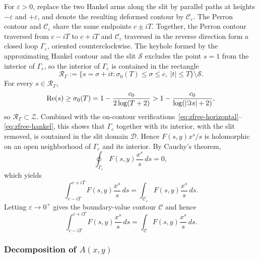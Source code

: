 For $\varepsilon>0$, replace the two Hankel arms along the slit by
parallel paths at heights $-\varepsilon$ and $+\varepsilon$, and
denote the resulting deformed contour by $\mathcal{C}_\varepsilon$.
The Perron contour and $\mathcal{C}_\varepsilon$ share the same
endpoints $c \pm iT$. Together, the Perron contour traversed from
$c - iT$ to $c + iT$ and $\mathcal{C}_\varepsilon$ traversed in
the reverse direction form a closed loop $\Gamma_\varepsilon$,
oriented counterclockwise. The keyhole formed by the approximating
Hankel contour and the slit $\mathcal{S}$ excludes the point
$s = 1$ from the interior of $\Gamma_\varepsilon$, so the interior
of $\Gamma_\varepsilon$ is contained in the rectangle
\begin{equation}\label{eq:Gamma-interior-bound}
    \mathcal{R}_\Gamma := \{ s = \sigma + it
    : \sigma_0(T) \leq \sigma \leq c, \ |t| \leq T \}
    \setminus \mathcal{S}.
\end{equation}
For every $s \in \mathcal{R}_\Gamma$,
\begin{equation}\label{eq:zfree-interior}
    \operatorname{Re}(s) \geq \sigma_0(T)
    = 1 - \frac{c_0}{2\log(T+2)}
    > 1 - \frac{c_0}{\log(|\Im s| + 2)},
\end{equation}
so $\mathcal{R}_\Gamma \subset \mathcal{Z}$. Combined with the
on-contour verifications~\eqref{eq:zfree-horizontal}--\eqref{eq:zfree-hankel},
this shows that $\Gamma_\varepsilon$ together with its interior,
with the slit removed, is contained in the slit domain
$\mathcal{D}$. Hence $F(s, y) x^s / s$ is holomorphic on an open
neighborhood of $\Gamma_\varepsilon$ and its interior. By Cauchy's
theorem,
\begin{equation}\label{eq:cauchy-zero}
    \oint_{\Gamma_\varepsilon} F(s, y) \frac{x^s}{s}\, ds = 0,
\end{equation}
which yields
\[
    \int_{c - iT}^{c + iT} F(s, y) \frac{x^s}{s}\, ds
    = \int_{\mathcal{C}_\varepsilon} F(s, y) \frac{x^s}{s}\, ds.
\]
Letting $\varepsilon\to0^+$ gives the boundary-value contour
$\mathcal{C}$ and hence
\begin{equation}\label{eq:contour-equality}
    \int_{c - iT}^{c + iT} F(s, y) \frac{x^s}{s}\, ds
    = \int_{\mathcal{C}} F(s, y) \frac{x^s}{s}\, ds.
\end{equation}

\subsubsection*{Decomposition of \texorpdfstring{$A(x, y)$}{A(x,y)}}

